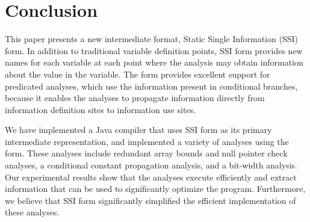 \section{Conclusion}

This paper presents a new intermediate format, 
Static Single Information (SSI) form. In addition
to traditional variable definition points, SSI
form provides new names for each variable at
each point where the analysis may obtain
information about the value in the variable. 
The form provides excellent support for predicated analyses,
which use the information present in conditional
branches, because it enables the analyses to propagate
information directly from information definition sites
to information use sites.

We have implemented a Java compiler that uses SSI
form as its primary intermediate representation, and
implemented a variety of analyses using the form.
These analyses include redundant array bounds and null pointer check analyses, a 
conditional constant
propagation analysis, and a bit-width analysis. Our experimental
results show that the analyses execute efficiently and extract
information that can be used to significantly optimize the
program. Furthermore, we believe that SSI form significantly
simplified the efficient implementation of these analyses.

